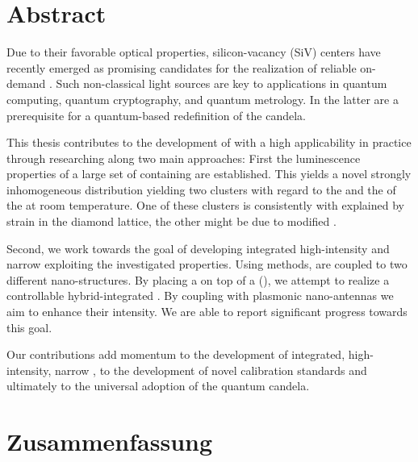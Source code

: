 
\null\vfill

\section*{Abstract}

	Due to their favorable optical properties, silicon-vacancy (SiV) centers have recently emerged as promising candidates for the realization of reliable on-demand \spss. 
	Such non-classical light sources are key to applications in quantum computing, quantum cryptography, and quantum metrology. 
	In the latter \spss are a prerequisite for a quantum-based redefinition of the candela.

	This thesis contributes to the development of \spss with a high applicability in practice through researching \sivs along two main approaches: 
	First the luminescence properties of a large set of \nds containing \sivs are established. 
	This yields a novel strongly inhomogeneous distribution yielding two clusters with regard to the \cws and the \lw of the \zpl at room temperature.
	One of these clusters is consistently with explained by strain in the diamond lattice, the other might be due to modified \sivs.

	Second, we work towards the goal of developing integrated high-intensity and narrow \lw \spss exploiting the investigated \siv properties.
	Using \pp methods, \sivs are coupled to two different nano-structures.
	By placing a \nd on top of a \vcsel (\VCSEL), we attempt to realize a controllable hybrid-integrated \sps. 
	By coupling \sivs with plasmonic nano-antennas we aim to enhance their \pl intensity. We are able to report significant progress towards this goal.

	Our contributions add momentum to the development of integrated, high-intensity, narrow \lw \spss, to the development of novel calibration standards and ultimately to the universal adoption of the quantum candela.




\vfill

\newpage

\null\vfill

\section*{Zusammenfassung}

